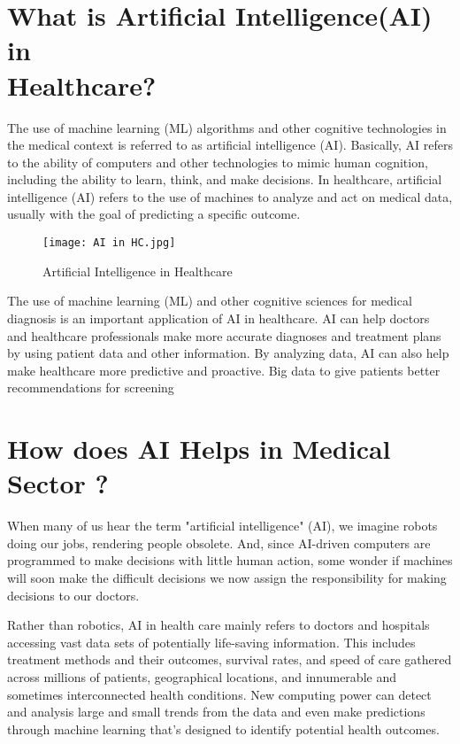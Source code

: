 \documentclass[12pt]{article}
\begin{document}
\clearpage

\section{What is Artificial Intelligence(AI) in\\ Healthcare?}
\hspace{1cm}
The use of machine learning (ML) algorithms and other cognitive technologies in the medical context is referred to as artificial intelligence (AI). Basically, AI refers to the ability of computers and other technologies to mimic human cognition, including the ability to learn, think, and make decisions. In healthcare, artificial intelligence (AI) refers to the use of machines to analyze and act on medical data, usually with the goal of predicting a specific outcome. 
 

\begin{figure}[h]
\centering
\texttt{[image: AI in HC.jpg]}
\caption{Artificial Intelligence in Healthcare}
\end{figure}

The use of machine learning (ML) and other cognitive sciences for medical diagnosis is an important application of AI  in healthcare. AI can help doctors and healthcare professionals make more accurate diagnoses and treatment plans by using patient data and other information. By analyzing data, AI can also help make healthcare more predictive and proactive. Big data to give patients better  recommendations for screening




\section{How does AI Helps in Medical Sector ?}
\hspace{1cm}
When many of us hear the term "artificial intelligence" (AI), we imagine robots doing our jobs, rendering people obsolete. And, since AI-driven computers are programmed to make decisions with little human action, some wonder if machines will soon make the difficult decisions we now assign the responsibility for making decisions to our doctors.

Rather than robotics, AI in health care mainly refers to doctors and hospitals accessing vast data sets of potentially life-saving information. This includes treatment methods and their outcomes, survival rates, and speed of care gathered across millions of patients, geographical locations, and innumerable and sometimes interconnected health conditions. New computing power can detect and analysis large and small trends from the data and even make predictions through machine learning that's designed to identify potential health outcomes.
\end{document}
